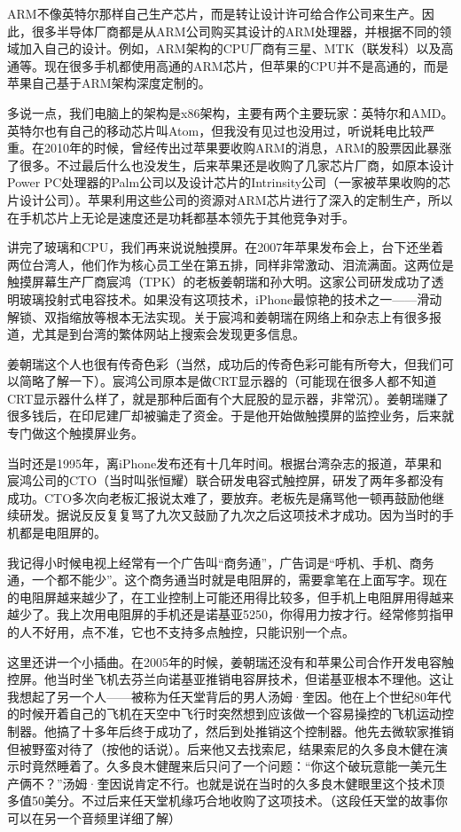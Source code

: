 \documentclass[
  letterpaper,
  DIV=11,
  numbers=noendperiod]{scrreprt}
\begin{document}
ARM不像英特尔那样自己生产芯片，而是转让设计许可给合作公司来生产。因此，很多半导体厂商都是从ARM公司购买其设计的ARM处理器，并根据不同的领域加入自己的设计。例如，ARM架构的CPU厂商有三星、MTK（联发科）以及高通等。现在很多手机都使用高通的ARM芯片，但苹果的CPU并不是高通的，而是苹果自己基于ARM架构深度定制的。

多说一点，我们电脑上的架构是x86架构，主要有两个主要玩家：英特尔和AMD。英特尔也有自己的移动芯片叫Atom，但我没有见过也没用过，听说耗电比较严重。在2010年的时候，曾经传出过苹果要收购ARM的消息，ARM的股票因此暴涨了很多。不过最后什么也没发生，后来苹果还是收购了几家芯片厂商，如原本设计Power
PC处理器的Palm公司以及设计芯片的Intrinsity公司（一家被苹果收购的芯片设计公司）。苹果利用这些公司的资源对ARM芯片进行了深入的定制生产，所以在手机芯片上无论是速度还是功耗都基本领先于其他竞争对手。

讲完了玻璃和CPU，我们再来说说触摸屏。在2007年苹果发布会上，台下还坐着两位台湾人，他们作为核心员工坐在第五排，同样非常激动、泪流满面。这两位是触摸屏幕生产厂商宸鸿（TPK）的老板姜朝瑞和孙大明。这家公司研发成功了透明玻璃投射式电容技术。如果没有这项技术，iPhone最惊艳的技术之一------滑动解锁、双指缩放等根本无法实现。关于宸鸿和姜朝瑞在网络上和杂志上有很多报道，尤其是到台湾的繁体网站上搜索会发现更多信息。

姜朝瑞这个人也很有传奇色彩（当然，成功后的传奇色彩可能有所夸大，但我们可以简略了解一下）。宸鸿公司原本是做CRT显示器的（可能现在很多人都不知道CRT显示器什么样了，就是那种后面有个大屁股的显示器，非常沉）。姜朝瑞赚了很多钱后，在印尼建厂却被骗走了资金。于是他开始做触摸屏的监控业务，后来就专门做这个触摸屏业务。

当时还是1995年，离iPhone发布还有十几年时间。根据台湾杂志的报道，苹果和宸鸿公司的CTO（当时叫张恒耀）联合研发电容式触控屏，研发了两年多都没有成功。CTO多次向老板汇报说太难了，要放弃。老板先是痛骂他一顿再鼓励他继续研发。据说反反复复骂了九次又鼓励了九次之后这项技术才成功。因为当时的手机都是电阻屏的。

我记得小时候电视上经常有一个广告叫``商务通''，广告词是``呼机、手机、商务通，一个都不能少''。这个商务通当时就是电阻屏的，需要拿笔在上面写字。现在的电阻屏越来越少了，在工业控制上可能还用得比较多，但手机上电阻屏用得越来越少了。我上次用电阻屏的手机还是诺基亚5250，你得用力按才行。经常修剪指甲的人不好用，点不准，它也不支持多点触控，只能识别一个点。

这里还讲一个小插曲。在2005年的时候，姜朝瑞还没有和苹果公司合作开发电容触控屏。他当时坐飞机去芬兰向诺基亚推销电容屏技术，但诺基亚根本不理他。这让我想起了另一个人------被称为任天堂背后的男人汤姆·奎因。他在上个世纪80年代的时候开着自己的飞机在天空中飞行时突然想到应该做一个容易操控的飞机运动控制器。他搞了十多年后终于成功了，然后到处推销这个控制器。他先去微软家推销但被野蛮对待了（按他的话说）。后来他又去找索尼，结果索尼的久多良木健在演示时竟然睡着了。久多良木健醒来后只问了一个问题：``你这个破玩意能一美元生产俩不？''汤姆·奎因说肯定不行。也就是说在当时的久多良木健眼里这个技术顶多值50美分。不过后来任天堂机缘巧合地收购了这项技术。（这段任天堂的故事你可以在另一个音频里详细了解）
\end{document}
